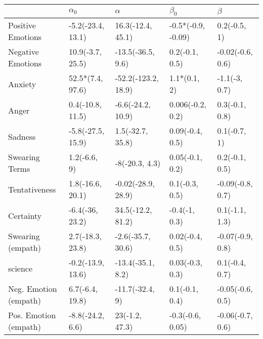 \begin{tabular}{lllll}
\toprule
{} &         $\alpha_0$ &             $\alpha$ &           $\beta_0$ &           $\beta$ \\
\midrule
Positive Emotions     &  -5.2(-23.4, 13.1) &    16.3(-12.4, 45.1) &  -0.5*(-0.9, -0.09) &      0.2(-0.5, 1) \\
Negative Emotions     &   10.9(-3.7, 25.5) &    -13.5(-36.5, 9.6) &      0.2(-0.1, 0.5) &  -0.02(-0.6, 0.6) \\
Anxiety               &   52.5*(7.4, 97.6) &  -52.2(-123.2, 18.9) &        1.1*(0.1, 2) &     -1.1(-3, 0.7) \\
Anger                 &   0.4(-10.8, 11.5) &    -6.6(-24.2, 10.9) &    0.006(-0.2, 0.2) &    0.3(-0.1, 0.8) \\
Sadness               &  -5.8(-27.5, 15.9) &     1.5(-32.7, 35.8) &     0.09(-0.4, 0.5) &      0.1(-0.7, 1) \\
Swearing Terms        &       1.2(-6.6, 9) &       -8(-20.3, 4.3) &     0.05(-0.1, 0.2) &    0.2(-0.1, 0.5) \\
Tentativeness         &   1.8(-16.6, 20.1) &   -0.02(-28.9, 28.9) &      0.1(-0.3, 0.5) &  -0.09(-0.8, 0.7) \\
Certainty             &    -6.4(-36, 23.2) &    34.5(-12.2, 81.2) &       -0.4(-1, 0.3) &    0.1(-1.1, 1.3) \\
Swearing (empath)     &   2.7(-18.3, 23.8) &    -2.6(-35.7, 30.6) &     0.02(-0.4, 0.5) &  -0.07(-0.9, 0.8) \\
science               &  -0.2(-13.9, 13.6) &    -13.4(-35.1, 8.2) &     0.03(-0.3, 0.3) &    0.1(-0.4, 0.7) \\
Neg. Emotion (empath) &    6.7(-6.4, 19.8) &      -11.7(-32.4, 9) &      0.1(-0.1, 0.4) &  -0.05(-0.6, 0.5) \\
Pos. Emotion (empath) &   -8.8(-24.2, 6.6) &       23(-1.2, 47.3) &    -0.3(-0.6, 0.05) &  -0.06(-0.7, 0.6) \\
\bottomrule
\end{tabular}
